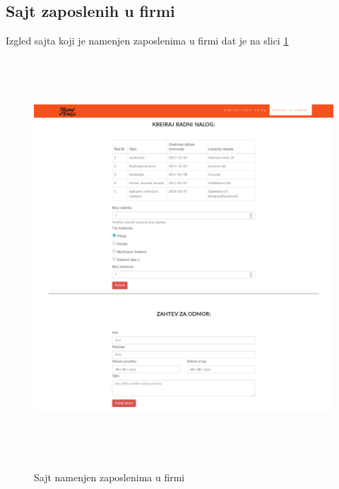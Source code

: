 \documentclass[10 pt]{article}
\begin{document}
	\newpage
	\subsection{Sajt zaposlenih u firmi}
	
	Izgled sajta koji je namenjen zaposlenima u firmi dat je na slici \ref{fig:StranaZaposlenih}	
	
		\begin{figure}[H]
			\centering
			\includegraphics[width=15cm,height=15cm,keepaspectratio]{GUI/stranaFirme.png}\\
			\caption{Sajt namenjen zaposlenima u firmi}
			\label{fig:StranaZaposlenih}
		\end{figure}
	\newpage
\end{document}

